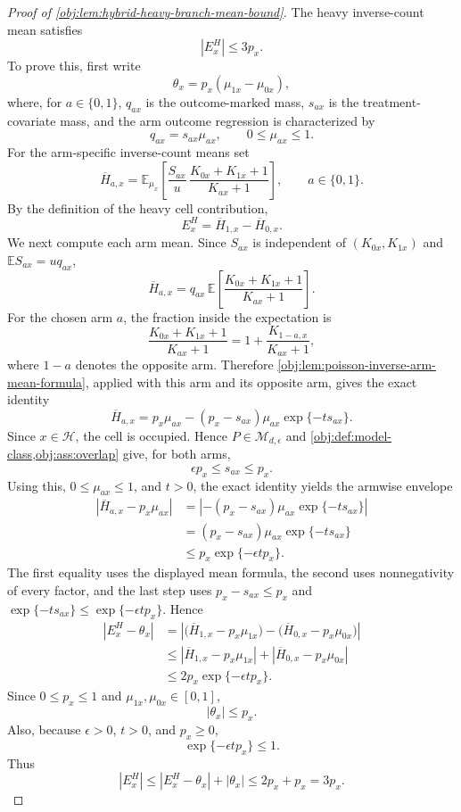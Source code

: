 \begin{proof}[Proof of \cref{obj:lem:hybrid-heavy-branch-mean-bound}]
The heavy inverse-count mean satisfies
\[
|E^H_x|\le 3p_x .
\]
To prove this, first write
\[
\theta_x=p_x(\mu_{1x}-\mu_{0x}),
\]
where, for \(a\in\{0,1\}\), \(q_{ax}\) is the outcome-marked mass, \(s_{ax}\) is the treatment-covariate mass, and the arm outcome regression is characterized by
\[
q_{ax}=s_{ax}\mu_{ax},\qquad 0\le \mu_{ax}\le 1 .
\]
For the arm-specific inverse-count means set
\[
\overline H_{a,x}
=
\mathbb E_{\mu_x}\!\left[
\frac{S_{ax}}{u}\,
\frac{K_{0x}+K_{1x}+1}{K_{ax}+1}
\right],\qquad a\in\{0,1\}.
\]
By the definition of the heavy cell contribution,
\[
E^H_x=\overline H_{1,x}-\overline H_{0,x}.
\]
We next compute each arm mean. Since \(S_{ax}\) is independent of \((K_{0x},K_{1x})\) and \(\mathbb E S_{ax}=u q_{ax}\),
\[
\overline H_{a,x}
=
q_{ax}\,
\mathbb E\!\left[\frac{K_{0x}+K_{1x}+1}{K_{ax}+1}\right].
\]
For the chosen arm \(a\), the fraction inside the expectation is
\[
\frac{K_{0x}+K_{1x}+1}{K_{ax}+1}
=
1+\frac{K_{1-a,x}}{K_{ax}+1},
\]
where \(1-a\) denotes the opposite arm. Therefore \cref{obj:lem:poisson-inverse-arm-mean-formula}, applied with this arm and its opposite arm, gives the exact identity
\[
\overline H_{a,x}
=
 p_x\mu_{ax}-(p_x-s_{ax})\mu_{ax}\exp\{-t s_{ax}\}.
\]
Since \(x\in\mathcal H\), the cell is occupied. Hence \(P\in\mathcal M_{d,\epsilon}\) and \cref{obj:def:model-class,obj:ass:overlap} give, for both arms,
\[
\epsilon p_x\le s_{ax}\le p_x .
\]
Using this, \(0\le\mu_{ax}\le1\), and \(t>0\), the exact identity yields the armwise envelope
\[
\begin{aligned}
|\overline H_{a,x}-p_x\mu_{ax}|
&=\left|-(p_x-s_{ax})\mu_{ax}\exp\{-t s_{ax}\}\right|\\
&=(p_x-s_{ax})\mu_{ax}\exp\{-t s_{ax}\}\\
&\le p_x\exp\{-\epsilon t p_x\}.
\end{aligned}
\]
The first equality uses the displayed mean formula, the second uses nonnegativity of every factor, and the last step uses \(p_x-s_{ax}\le p_x\) and \(\exp\{-t s_{ax}\}\le\exp\{-\epsilon t p_x\}\). Hence
\[
\begin{aligned}
|E^H_x-\theta_x|
&=\left|\bigl(\overline H_{1,x}-p_x\mu_{1x}\bigr)
      -\bigl(\overline H_{0,x}-p_x\mu_{0x}\bigr)\right|\\
&\le |\overline H_{1,x}-p_x\mu_{1x}|
   + |\overline H_{0,x}-p_x\mu_{0x}|\\
&\le 2p_x\exp\{-\epsilon t p_x\}.
\end{aligned}
\]
Since \(0\le p_x\le1\) and \(\mu_{1x},\mu_{0x}\in[0,1]\),
\[
|\theta_x|\le p_x .
\]
Also, because \(\epsilon>0\), \(t>0\), and \(p_x\ge0\),
\[
\exp\{-\epsilon t p_x\}\le1.
\]
Thus
\[
|E^H_x|
\le |E^H_x-\theta_x|+|\theta_x|
\le 2p_x+p_x
=3p_x .
\]


\end{proof}
